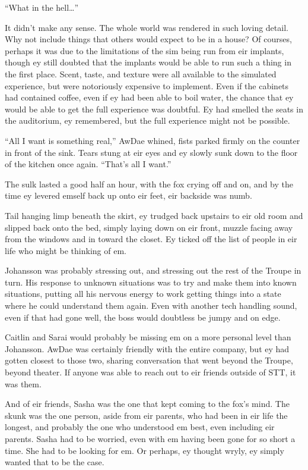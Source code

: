 ``What in the hell\ldots{}''

It didn't make any sense. The whole world was rendered in such loving detail. Why not include things that others would expect to be in a house? Of courses, perhaps it was due to the limitations of the sim being run from eir implants, though ey still doubted that the implants would be able to run such a thing in the first place. Scent, taste, and texture were all available to the simulated experience, but were notoriously expensive to implement. Even if the cabinets had contained coffee, even if ey had been able to boil water, the chance that ey would be able to get the full experience was doubtful. Ey had smelled the seats in the auditorium, ey remembered, but the full experience might not be possible.

``All I want is something real,'' AwDae whined, fists parked firmly on the counter in front of the sink. Tears stung at eir eyes and ey slowly sunk down to the floor of the kitchen once again. ``That's all I want.''

The sulk lasted a good half an hour, with the fox crying off and on, and by the time ey levered emself back up onto eir feet, eir backside was numb.

Tail hanging limp beneath the skirt, ey trudged back upstairs to eir old room and slipped back onto the bed, simply laying down on eir front, muzzle facing away from the windows and in toward the closet. Ey ticked off the list of people in eir life who might be thinking of em.

Johansson was probably stressing out, and stressing out the rest of the Troupe in turn. His response to unknown situations was to try and make them into known situations, putting all his nervous energy to work getting things into a state where he could understand them again. Even with another tech handling sound, even if that had gone well, the boss would doubtless be jumpy and on edge.

Caitlin and Sarai would probably be missing em on a more personal level than Johansson. AwDae was certainly friendly with the entire company, but ey had gotten closest to those two, sharing conversation that went beyond the Troupe, beyond theater. If anyone was able to reach out to eir friends outside of STT, it was them.

And of eir friends, Sasha was the one that kept coming to the fox's mind. The skunk was the one person, aside from eir parents, who had been in eir life the longest, and probably the one who understood em best, even including eir parents. Sasha had to be worried, even with em having been gone for so short a time. She had to be looking for em. Or perhaps, ey thought wryly, ey simply wanted that to be the case.

